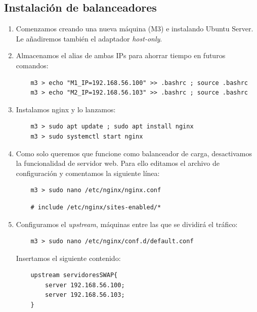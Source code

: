 \documentclass[12pt,spanish]{article}
\begin{document}
\subsection{Instalación de balanceadores}
\begin{enumerate}
	\item Comenzamos creando una nueva máquina (M3) e instalando Ubuntu Server. Le añadiremos también el adaptador \emph{host-only}.
	\item Almacenamos el alias de ambas IPs para ahorrar tiempo en futuros comandos:
		\begin{lstlisting}
	m3 > echo "M1_IP=192.168.56.100" >> .bashrc ; source .bashrc
	m3 > echo "M2_IP=192.168.56.103" >> .bashrc ; source .bashrc
		\end{lstlisting}
	\item Instalamos nginx y lo lanzamos:
		\begin{lstlisting}
	m3 > sudo apt update ; sudo apt install nginx
	m3 > sudo systemctl start nginx
		\end{lstlisting}
	\item Como solo queremos que funcione como balanceador de carga, desactivamos la funcionalidad de servidor web. Para ello editamos el archivo de configuración y comentamos la siguiente línea:
		\begin{lstlisting}
	m3 > sudo nano /etc/nginx/nginx.conf
		\end{lstlisting}
			\begin{lstlisting}
	# include /etc/nginx/sites-enabled/*
			\end{lstlisting}
		\item Configuramos el \emph{upstream}, máquinas entre las que se dividirá el tráfico:
		\begin{lstlisting}
	m3 > sudo nano /etc/nginx/conf.d/default.conf
		\end{lstlisting}
		Insertamos el siguiente contenido:
		\begin{lstlisting}
	upstream servidoresSWAP{
		server 192.168.56.100;
		server 192.168.56.103;
	}


\end{lstlisting}
\end{enumerate}
\end{document}
